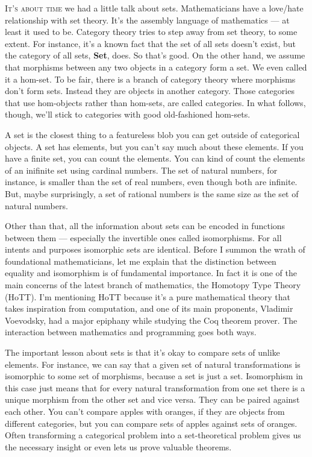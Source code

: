 \lettrine[lhang=0.17]{I}{t's about time} we had a little talk about sets. Mathematicians have a
love/hate relationship with set theory. It's the assembly language of
mathematics --- at least it used to be. Category theory tries to step
away from set theory, to some extent. For instance, it's a known fact
that the set of all sets doesn't exist, but the category of all sets,
\textbf{Set}, does. So that's good. On the other hand, we assume that
morphisms between any two objects in a category form a set. We even
called it a hom-set. To be fair, there is a branch of category theory
where morphisms don't form sets. Instead they are objects in another
category. Those categories that use hom-objects rather than hom-sets,
are called  categories. In what follows, though, we'll
stick to categories with good old-fashioned hom-sets.

A set is the closest thing to a featureless blob you can get outside of
categorical objects. A set has elements, but you can't say much about
these elements. If you have a finite set, you can count the elements.
You can kind of count the elements of an inifinite set using cardinal
numbers. The set of natural numbers, for instance, is smaller than the
set of real numbers, even though both are infinite. But, maybe
surprisingly, a set of rational numbers is the same size as the set of
natural numbers.

Other than that, all the information about sets can be encoded in
functions between them --- especially the invertible ones called
isomorphisms. For all intents and purposes isomorphic sets are
identical. Before I summon the wrath of foundational mathematicians, let
me explain that the distinction between equality and isomorphism is of
fundamental importance. In fact it is one of the main concerns of the
latest branch of mathematics, the Homotopy Type Theory (HoTT). I'm
mentioning HoTT because it's a pure mathematical theory that takes
inspiration from computation, and one of its main proponents, Vladimir
Voevodsky, had a major epiphany while studying the Coq theorem prover.
The interaction between mathematics and programming goes both ways.

The important lesson about sets is that it's okay to compare sets of
unlike elements. For instance, we can say that a given set of natural
transformations is isomorphic to some set of morphisms, because a set is
just a set. Isomorphism in this case just means that for every natural
transformation from one set there is a unique morphism from the other
set and vice versa. They can be paired against each other. You can't
compare apples with oranges, if they are objects from different
categories, but you can compare sets of apples against sets of oranges.
Often transforming a categorical problem into a set-theoretical problem
gives us the necessary insight or even lets us prove valuable theorems.

